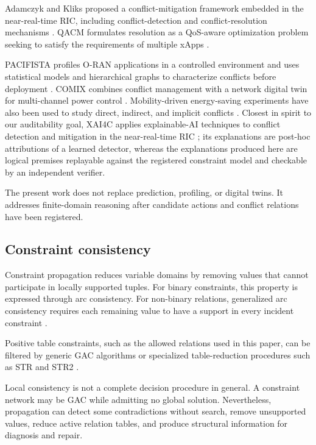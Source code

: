 \documentclass[pdflatex,sn-mathphys-num,iicol,oneside]{sn-jnl}
\begin{document}
Adamczyk and Kliks proposed a conflict-mitigation framework embedded
in the near-real-time RIC, including conflict-detection and
conflict-resolution mechanisms \cite{adamczyk2023conflict}. QACM
formulates resolution as a QoS-aware optimization problem seeking to
satisfy the requirements of multiple xApps \cite{wadud2024qacm}.

PACIFISTA profiles O-RAN applications in a controlled environment and
uses statistical models and hierarchical graphs to characterize
conflicts before deployment \cite{prever2025pacifista}. COMIX
combines conflict management with a network digital twin for
multi-channel power control \cite{giannopoulos2025comix}.
Mobility-driven energy-saving experiments have also been used to
study direct, indirect, and implicit conflicts
\cite{wadud2025mobility}. Closest in spirit to our auditability goal,
XAI4C applies explainable-AI techniques to conflict detection and
mitigation in the near-real-time RIC \cite{varshney2025xai4c}; its
explanations are post-hoc attributions of a learned detector, whereas
the explanations produced here are logical premises replayable against
the registered constraint model and checkable by an independent
verifier.

The present work does not replace prediction, profiling, or digital
twins. It addresses finite-domain reasoning after candidate actions
and conflict relations have been registered.

\subsection{Constraint consistency}

Constraint propagation reduces variable domains by removing values
that cannot participate in locally supported tuples. For binary
constraints, this property is expressed through arc consistency.
For non-binary relations, generalized arc consistency requires each
remaining value to have a support in every incident constraint
\cite{yap2020gac}.

Positive table constraints, such as the allowed relations used in
this paper, can be filtered by generic GAC algorithms or specialized
table-reduction procedures such as STR and STR2
\cite{lecoutre2011str2}.

Local consistency is not a complete decision procedure in general.
A constraint network may be GAC while admitting no global solution.
Nevertheless, propagation can detect some contradictions without
search, remove unsupported values, reduce active relation tables, and
produce structural information for diagnosis and repair.
\end{document}
